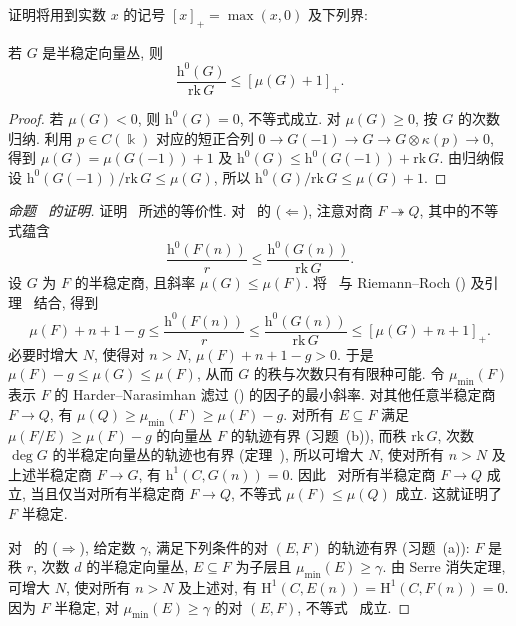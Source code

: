 证明将用到实数 $x$ 的记号 $[x]_+=\max(x,0)$ 及下列界:
\begin{lemma}\label{src:9.5.9}
若 $G$ 是半稳定向量丛, 则
\[
\frac{\mathrm h^0(G)}{\mathrm{rk}\,G}\leq[\mu(G)+1]_+.
\]
\end{lemma}
\begin{proof}
若 $\mu(G)<0$, 则 $\mathrm h^0(G)=0$, 不等式成立. 对 $\mu(G)\geq0$, 按 $G$ 的次数归纳. 利用 $p\in C(\Bbbk)$ 对应的短正合列 $0\to G(-1)\to G\to G\otimes\kappa(p)\to0$, 得到 $\mu(G)=\mu(G(-1))+1$ 及 $\mathrm h^0(G)\leq\mathrm h^0(G(-1))+\mathrm{rk}\,G$. 由归纳假设 $\mathrm h^0(G(-1))/\mathrm{rk}\,G\leq\mu(G)$, 所以 $\mathrm h^0(G)/\mathrm{rk}\,G\leq\mu(G)+1$.
\end{proof}
\begin{proof}[命题~ 的证明]
证明~ 所述的等价性. 对~ 的 ($\Leftarrow$), 注意对商 $F\twoheadrightarrow Q$, 其中的不等式蕴含
\begin{equation}\label{src:9.5.10}
\frac{\mathrm h^0(F(n))}{r}\leq\frac{\mathrm h^0(G(n))}{\mathrm{rk}\,G}.
\end{equation}
设 $G$ 为 $F$ 的半稳定商, 且斜率 $\mu(G)\leq\mu(F)$. 将~ 与 Riemann--Roch () 及引理~ 结合, 得到
\[
\mu(F)+n+1-g\leq\frac{\mathrm h^0(F(n))}{r}\leq\frac{\mathrm h^0(G(n))}{\mathrm{rk}\,G}\leq[\mu(G)+n+1]_+.
\]
必要时增大 $N$, 使得对 $n>N$, $\mu(F)+n+1-g>0$. 于是 $\mu(F)-g\leq\mu(G)\leq\mu(F)$, 从而 $G$ 的秩与次数只有有限种可能. 令 $\mu_{\min}(F)$ 表示 $F$ 的 Harder--Narasimhan 滤过 () 的因子的最小斜率. 对其他任意半稳定商 $F\to Q$, 有 $\mu(Q)\geq\mu_{\min}(F)\geq\mu(F)-g$. 对所有 $E\subseteq F$ 满足 $\mu(F/E)\geq\mu(F)-g$ 的向量丛 $F$ 的轨迹有界 (习题~(b)), 而秩 $\mathrm{rk}\,G$, 次数 $\deg G$ 的半稳定向量丛的轨迹也有界 (定理~), 所以可增大 $N$, 使对所有 $n>N$ 及上述半稳定商 $F\to G$, 有 $\mathrm h^1(C,G(n))=0$. 因此~ 对所有半稳定商 $F\to Q$ 成立, 当且仅当对所有半稳定商 $F\to Q$, 不等式 $\mu(F)\leq\mu(Q)$ 成立. 这就证明了 $F$ 半稳定.

对~ 的 ($\Rightarrow$), 给定数 $\gamma$, 满足下列条件的对 $(E,F)$ 的轨迹有界 (习题~(a)): $F$ 是秩 $r$, 次数 $d$ 的半稳定向量丛, $E\subseteq F$ 为子层且 $\mu_{\min}(E)\geq\gamma$. 由 Serre 消失定理, 可增大 $N$, 使对所有 $n>N$ 及上述对, 有 $\mathrm H^1(C,E(n))=\mathrm H^1(C,F(n))=0$. 因为 $F$ 半稳定, 对 $\mu_{\min}(E)\geq\gamma$ 的对 $(E,F)$, 不等式~ 成立.


\end{proof}
